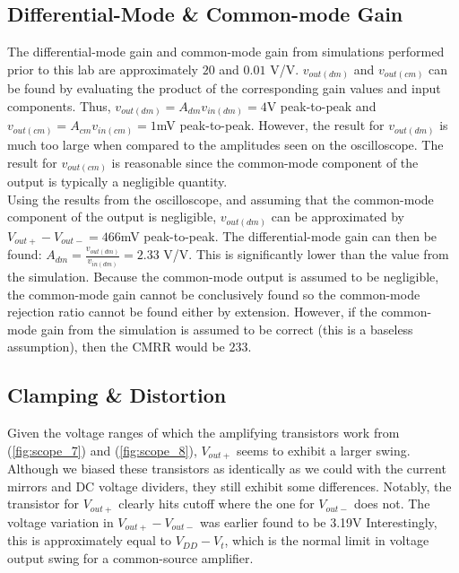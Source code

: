 \subsection{Differential-Mode \& Common-mode Gain}

The differential-mode gain and common-mode gain from simulations performed prior to this lab are approximately $20$ and $0.01$ \si{\volt}/\si{\volt}.
$v_{out(dm)}$ and $v_{out(cm)}$ can be found by evaluating the product of the corresponding gain values and input components.
Thus, $v_{out(dm)} = A_{dm}v_{in(dm)} = 4$\si{\volt} peak-to-peak and $v_{out(cm)} = A_{cm}v_{in(cm)} = 1$\si{\milli\volt} peak-to-peak.
However, the result for $v_{out(dm)}$ is much too large when compared to the amplitudes seen on the oscilloscope.
The result for $v_{out(cm)}$ is reasonable since the common-mode component of the output is typically a negligible quantity. \\

Using the results from the oscilloscope, and assuming that the common-mode component of the output is negligible, $v_{out(dm)}$ can be approximated by $V_{out+} - V_{out-} = 466$\si{\milli\volt} peak-to-peak.
The differential-mode gain can then be found: $A_{dm} = \frac{v_{out(dm)}}{v_{in(dm)}} = 2.33$ \si{\volt}/\si{\volt}.
This is significantly lower than the value from the simulation.
Because the common-mode output is assumed to be negligible, the common-mode gain cannot be conclusively found so the common-mode rejection ratio cannot be found either by extension.
However, if the common-mode gain from the simulation is assumed to be correct (this is a baseless assumption), then the CMRR would be $233$. \\

\subsection{Clamping \& Distortion}

Given the voltage ranges of which the amplifying transistors work from (\ref{fig:scope_7}) and (\ref{fig:scope_8}), $V_{out+}$ seems to exhibit a larger swing.
Although we biased these transistors as identically as we could with the current mirrors and DC voltage dividers, they still exhibit some differences.
Notably, the transistor for $V_{out+}$ clearly hits cutoff where the one for $V_{out-}$ does not.
The voltage variation in $V_{out+} - V_{out-}$ was earlier found to be 3.19\si{\volt}
Interestingly, this is approximately equal to $V_{DD} - V_{t}$, which is the normal limit in voltage output swing for a common-source amplifier.

